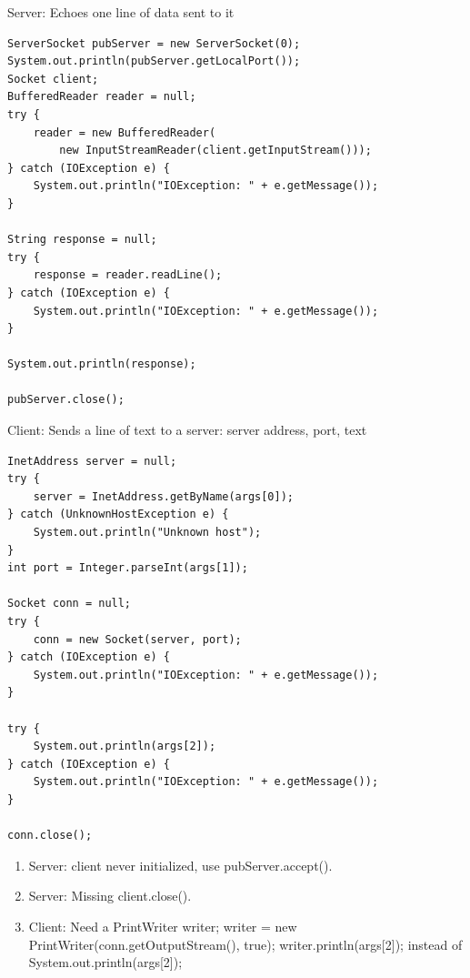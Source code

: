 \documentclass[11pt]{article}
\newenvironment{answer}{\large\lstset{basicstyle=\tiny\ttfamily}\color{white}}{}
\newenvironment{answer}{\large\lstset{basicstyle=\large\ttfamily}\color{red}}{}
\begin{document}
\begin{enumerate}
	Server: Echoes one line of data sent to it

	\begin{lstlisting}
ServerSocket pubServer = new ServerSocket(0);
System.out.println(pubServer.getLocalPort());
Socket client;
BufferedReader reader = null;
try {
	reader = new BufferedReader(
		new InputStreamReader(client.getInputStream()));
} catch (IOException e) {
	System.out.println("IOException: " + e.getMessage());
}

String response = null;
try {
	response = reader.readLine();
} catch (IOException e) {
	System.out.println("IOException: " + e.getMessage());
}

System.out.println(response);

pubServer.close();
	\end{lstlisting}

	Client: Sends a line of text to a server: server address, port, text

	\begin{lstlisting}
InetAddress server = null;
try {
	server = InetAddress.getByName(args[0]);
} catch (UnknownHostException e) {
	System.out.println("Unknown host");
}
int port = Integer.parseInt(args[1]);

Socket conn = null;
try {
	conn = new Socket(server, port);
} catch (IOException e) {
	System.out.println("IOException: " + e.getMessage());
}

try {
	System.out.println(args[2]);
} catch (IOException e) {
	System.out.println("IOException: " + e.getMessage());
}

conn.close();
	\end{lstlisting}

	\begin{answer}
		\begin{enumerate}
		\item
			Server: client never initialized, use pubServer.accept().
		\item
			Server: Missing client.close().
		\item
			Client: Need a PrintWriter writer; writer = new PrintWriter(conn.getOutputStream(), true); writer.println(args[2]); instead of System.out.println(args[2]);
		\end{enumerate}
	\end{answer}

\end{enumerate}
\end{document}
